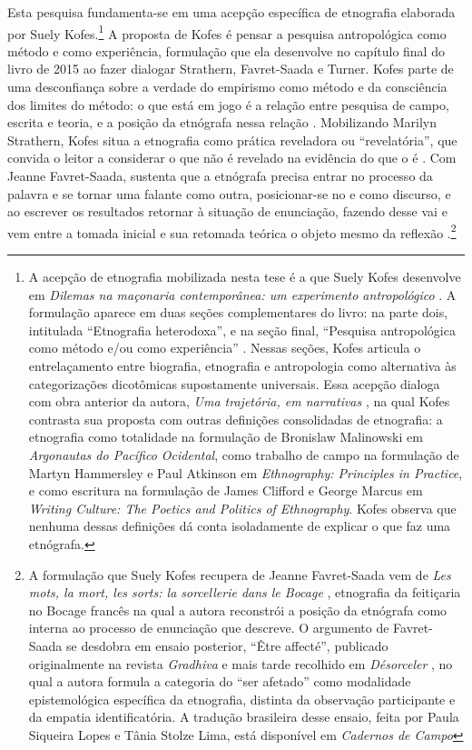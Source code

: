 Esta pesquisa fundamenta-se em uma acepção específica de etnografia elaborada por Suely Kofes.\footnote{A acepção de etnografia mobilizada nesta tese é a que Suely Kofes desenvolve em \textit{Dilemas na maçonaria contemporânea: um experimento antropológico} \parencite{Kofes2015Maconaria}. A formulação aparece em duas seções complementares do livro: na parte dois, intitulada \enquote{Etnografia heterodoxa}, e na seção final, \enquote{Pesquisa antropológica como método e/ou como experiência} \parencite[pp.~291--303]{Kofes2015Maconaria}. Nessas seções, Kofes articula o entrelaçamento entre biografia, etnografia e antropologia como alternativa às categorizações dicotômicas supostamente universais.
Essa acepção dialoga com obra anterior da autora, \textit{Uma trajetória, em narrativas} \parencite{kofes2001trajetoria}, na qual Kofes contrasta sua proposta com outras definições consolidadas de etnografia: a etnografia como totalidade na formulação de Bronislaw Malinowski em \textit{Argonautas do Pacífico Ocidental}, como trabalho de campo na formulação de Martyn Hammersley e Paul Atkinson em \textit{Ethnography: Principles in Practice}, e como escritura na formulação de James Clifford e George Marcus em \textit{Writing Culture: The Poetics and Politics of Ethnography}. Kofes observa que nenhuma dessas definições dá conta isoladamente de explicar o que faz uma etnógrafa.} A proposta de Kofes é pensar a pesquisa antropológica como método e como experiência, formulação que ela desenvolve no capítulo final do livro de 2015 ao fazer dialogar Strathern, Favret-Saada e Turner. Kofes parte de uma desconfiança sobre a verdade do empirismo como método e da consciência dos limites do método: o que está em jogo é a relação entre pesquisa de campo, escrita e teoria, e a posição da etnógrafa nessa relação \parencite[pp.~298, 300]{Kofes2015Maconaria}. Mobilizando Marilyn Strathern, Kofes situa a etnografia como prática reveladora ou \enquote{revelatória}, que convida o leitor a considerar o que não é revelado na evidência do que o é \parencite[p.~297]{Kofes2015Maconaria}. Com Jeanne Favret-Saada, sustenta que a etnógrafa precisa entrar no processo da palavra e se tornar uma falante como outra, posicionar-se no e como discurso, e ao escrever os resultados retornar à situação de enunciação, fazendo desse vai e vem entre a tomada inicial e sua retomada teórica o objeto mesmo da reflexão \parencite[p.~299]{Kofes2015Maconaria}.\footnote{A formulação que Suely Kofes recupera de Jeanne Favret-Saada vem de \textit{Les mots, la mort, les sorts: la sorcellerie dans le Bocage} \parencite[p.~32]{FavretSaada1977}, etnografia da feitiçaria no Bocage francês na qual a autora reconstrói a posição da etnógrafa como interna ao processo de enunciação que descreve. O argumento de Favret-Saada se desdobra em ensaio posterior, \enquote{Être affecté}, publicado originalmente na revista \textit{Gradhiva} e mais tarde recolhido em \textit{Désorceler} \parencite{FavretSaada1990SerAfetado}, no qual a autora formula a categoria do \enquote{ser afetado} como modalidade epistemológica específica da etnografia, distinta da observação participante e da empatia identificatória. A tradução brasileira desse ensaio, feita por Paula Siqueira Lopes e Tânia Stolze Lima, está disponível em \textit{Cadernos de Campo} }
